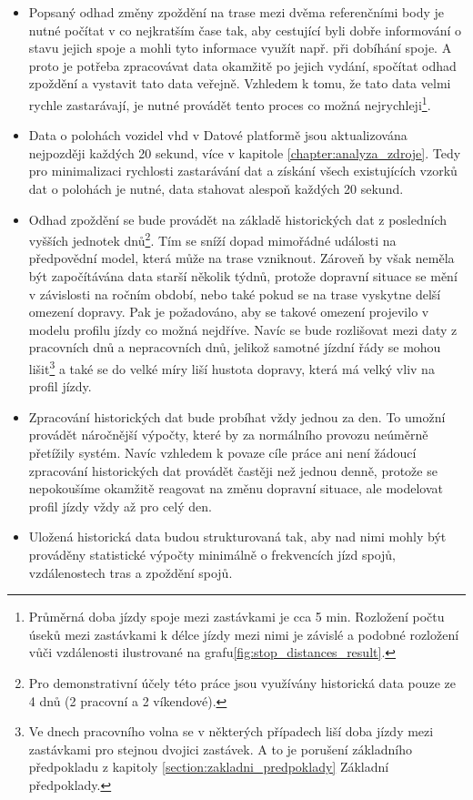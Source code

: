 \begin{itemize}
\item
Popsaný odhad změny zpoždění na trase mezi dvěma referenčními body je nutné počítat v co nejkratším čase tak, aby cestující byli dobře informování o stavu jejich spoje a mohli tyto informace využít např. při dobíhání spoje. A proto je potřeba zpracovávat data okamžitě po jejich vydání, spočítat odhad zpoždění a vystavit tato data veřejně. Vzhledem k tomu, že tato data velmi rychle zastarávají, je nutné provádět tento proces co možná nejrychleji\footnote{Průměrná doba jízdy spoje mezi zastávkami je cca 5 min. Rozložení počtu úseků mezi zastávkami k délce jízdy mezi nimi je závislé a podobné rozložení vůči vzdálenosti ilustrované na grafu\ref{fig:stop_distances_result}.}.


\item


Data o polohách vozidel \gls{vhd} v Datové platformě jsou aktualizována nejpozději každých 20 sekund, více v kapitole \ref{chapter:analyza_zdroje}. Tedy pro minimalizaci rychlosti zastarávání dat a získání všech existujících vzorků dat o polohách je nutné, data stahovat alespoň každých 20 sekund.


\item


Odhad zpoždění se bude provádět na základě historických dat z posledních vyšších jednotek dnů\footnote{Pro demonstrativní účely této práce jsou využívány historická data pouze ze 4 dnů (2 pracovní a 2 víkendové).}. Tím se sníží dopad mimořádné události na předpovědní model, která může na trase vzniknout. Zároveň by však neměla být započítávána data starší několik týdnů, protože dopravní situace se mění v závislosti na ročním období, nebo také pokud se na trase vyskytne delší omezení dopravy. Pak je požadováno, aby se takové omezení projevilo v modelu profilu jízdy co možná nejdříve. Navíc se bude rozlišovat mezi daty z pracovních dnů a nepracovních dnů, jelikož samotné jízdní řády se mohou lišit\footnote{Ve dnech pracovního volna se v některých případech liší doba jízdy mezi zastávkami pro stejnou dvojici zastávek. A to je porušení základního předpokladu z kapitoly \ref{section:zakladni_predpoklady} Základní předpoklady.} a také se do velké míry liší hustota dopravy, která má velký vliv na profil jízdy.


\item


Zpracování historických dat bude probíhat vždy jednou za den. To umožní provádět náročnější výpočty, které by za normálního provozu neúměrně přetížily systém. Navíc vzhledem k povaze cíle práce ani není žádoucí zpracování historických dat provádět častěji než jednou denně, protože se nepokoušíme okamžitě reagovat na změnu dopravní situace, ale modelovat profil jízdy vždy až pro celý den.


\item


Uložená historická data budou strukturovaná tak, aby nad nimi mohly být prováděny statistické výpočty minimálně o frekvencích jízd spojů, vzdálenostech tras a zpoždění spojů.
\end{itemize}


